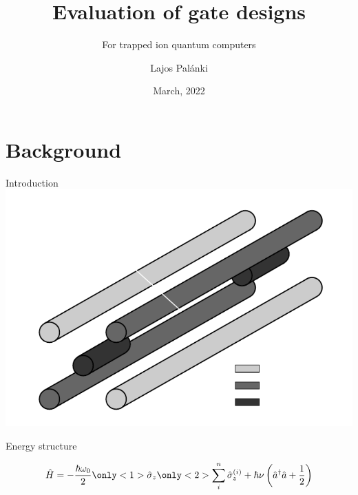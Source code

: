 \documentclass[aspectratio=169]{beamer}
\title{Evaluation of gate designs} %
\subtitle{For trapped ion quantum computers}
\author[L. Pal\' anki]{Lajos Pal\' anki}
\institute[ICL]{
    Department of Physics%
    \\%
    Imperial College London%
} %
\date{March, 2022}
\begin{document}
    
    \frame{\titlepage}
    
    
    
    
    \section{Background}
    \begin{frame}{Introduction}
    	\centering
    	\includegraphics[width=0.6\linewidth]{RF_Trap.pdf}
    \end{frame}
	\begin{frame}{Energy structure}
		\begin{figure}
			\centering
			\[\hat{H}=-\frac{\hbar\omega_0}{2}\only<1>{\hat{\sigma}_z}\only<2>{\sum_i^n\hat{\sigma}_z^{(i)}} + \hbar\nu \left(\hat{a}^\dagger\hat{a} + \frac{1}{2}\right)\]
		\end{figure}
	\end{frame}
\end{document}
